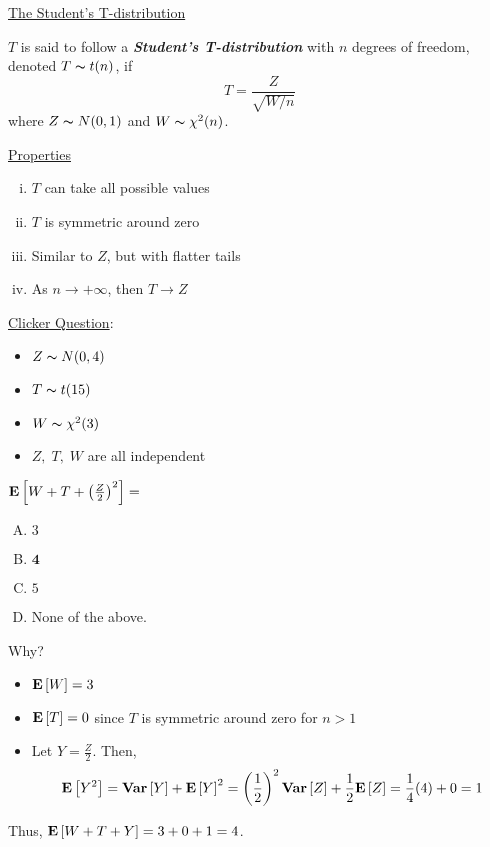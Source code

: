 \underline{The Student's T-distribution}
\begin{defbox}
    \begin{definition}
        $ T $ is said to follow a \textbf{\emph{Student's T-distribution}} with
        $ n $ degrees of freedom, denoted $ T \thicksim t(n) $, if
        \[ T=\frac{Z}{\sqrt{W/n}}  \]
        where $ Z \thicksim N(0,1) $ and $ W \thicksim \chi^2(n) $.
    \end{definition}
\end{defbox}
\underline{Properties}
\begin{enumerate}[(i)]
    \item $ T $ can take all possible values
    \item $ T $ is symmetric around zero
    \item Similar to $ Z $, but with flatter tails
    \item As $ n\rightarrow+\infty $, then $ T\rightarrow Z $
\end{enumerate}
\underline{Clicker Question}:
\begin{itemize}
    \item $ Z \thicksim N(0,4) $
    \item $ T \thicksim t(15) $
    \item $ W \thicksim \chi^2(3) $
    \item $ Z,\;T,\;W $ are all independent
\end{itemize}
$ \bm{\mathrm{E}}\left[W+T+\left( \frac{Z}{2} \right)^2\right] = $
\begin{enumerate}[(A)]
    \item $ 3 $
    \item $ \bm{4} $
    \item $ 5 $
    \item None of the above.
\end{enumerate}
Why?
\begin{itemize}
    \item $ \bm{\mathrm{E}}\left[W\right]=3 $
    \item $ \bm{\mathrm{E}}\left[T\right]=0 $ since $ T $ is symmetric around zero for $ n>1 $
    \item Let $ Y=\frac{Z}{2} $. Then,
          \[ \bm{\mathrm{E}}\left[Y^2\right]=\bm{\mathrm{Var}}\left[Y\right]+\bm{\mathrm{E}}\left[Y\right]^2
              =\left( \frac{1}{2} \right)^2 \bm{\mathrm{Var}}\left[Z\right]+\frac{1}{2} \bm{\mathrm{E}}\left[Z\right]
              =\frac{1}{4}(4)+0
              =1 \]
\end{itemize}
Thus, $ \bm{\mathrm{E}}\left[W+T+Y\right]=3+0+1=4 $.

